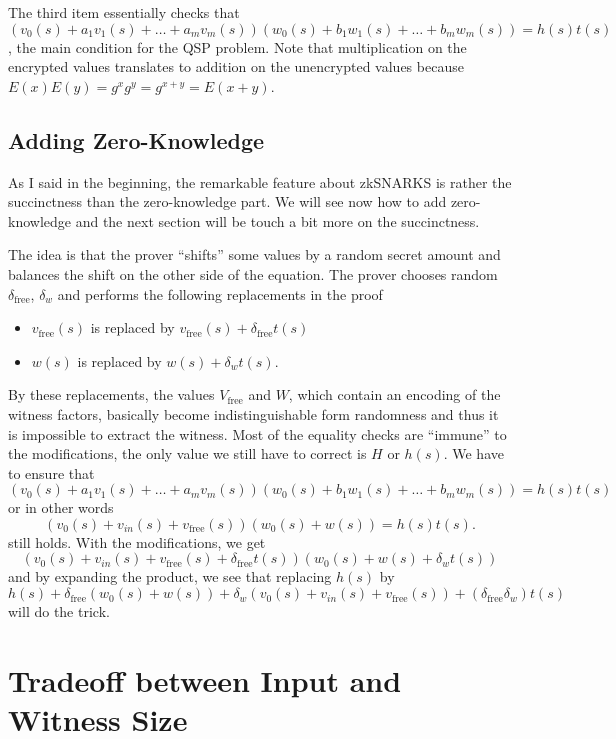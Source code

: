 \documentclass[11pt,letterpaper]{article}
\begin{document}
The third item essentially checks that $(v_{0}(s) + a_{1}v_{1}(s) +  \dots  + a_{m}v_{m}(s)) (w_{0}(s) + b_{1}w_{1}(s) +  \dots  + b_{m}w_{m}(s)) = h(s) t(s)$, the main condition for the QSP problem. Note that multiplication on the encrypted values translates to addition on the unencrypted values because $E(x) E(y) = g^{x} g^{y} = g^{x+y} = E(x + y)$.

\subsection{Adding Zero-Knowledge}


As I said in the beginning, the remarkable feature about zkSNARKS is rather the succinctness than the zero-knowledge part. We will see now how to add zero-knowledge and the next section will be touch a bit more on the succinctness.


The idea is that the prover ``shifts'' some values by a random secret amount and balances the shift on the other side of the equation. The prover chooses random $\delta _\mathrm{free}$, $\delta _{w}$ and performs the following replacements in the proof
\begin{itemize}
\item $v_\mathrm{free}(s)$ is replaced by $v_\mathrm{free}(s) + \delta _\mathrm{free} t(s)$
\item $w(s)$ is replaced by $w(s) + \delta _{w} t(s)$.
\end{itemize}


By these replacements, the values $V_\mathrm{free}$ and $W$, which contain an encoding of the witness factors, basically become indistinguishable form randomness and thus it is impossible to extract the witness. Most of the equality checks are ``immune'' to the modifications, the only value we still have to correct is $H$ or $h(s)$. We have to ensure that
\[ (v_{0}(s) + a_{1}v_{1}(s) +  \dots  + a_{m}v_{m}(s)) (w_{0}(s) + b_{1}w_{1}(s) +  \dots  + b_{m}w_{m}(s)) = h(s) t(s)\]
or in other words
\[(v_{0}(s) + v_{in}(s) + v_\mathrm{free}(s)) (w_{0}(s) + w(s)) = h(s) t(s).\]
still holds. With the modifications, we get
\[ (v_{0}(s) + v_{in}(s) + v_\mathrm{free}(s) + \delta _\mathrm{free} t(s)) (w_{0}(s) + w(s) + \delta _{w} t(s))
\]
and by expanding the product, we see that replacing $h(s)$ by
\[
    h(s) + \delta _\mathrm{free} (w_{0}(s) + w(s)) + \delta _{w} (v_{0}(s) + v_{in}(s) + v_\mathrm{free}(s)) + (\delta _\mathrm{free} \delta _{w}) t(s)
\]
will do the trick.

\section{Tradeoff between Input and Witness Size}
\end{document}
